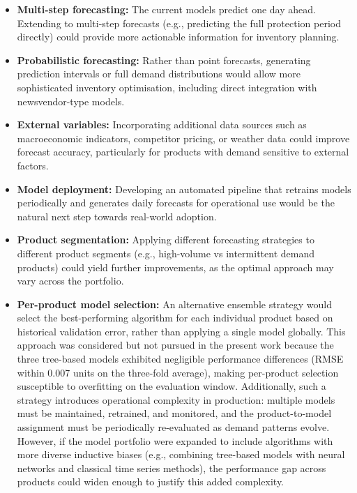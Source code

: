 \begin{itemize}
    \item \textbf{Multi-step forecasting:} The current models predict one day ahead. Extending to multi-step forecasts (e.g., predicting the full protection period directly) could provide more actionable information for inventory planning.

    \item \textbf{Probabilistic forecasting:} Rather than point forecasts, generating prediction intervals or full demand distributions would allow more sophisticated inventory optimisation, including direct integration with newsvendor-type models.

    \item \textbf{External variables:} Incorporating additional data sources such as macroeconomic indicators, competitor pricing, or weather data could improve forecast accuracy, particularly for products with demand sensitive to external factors.

    \item \textbf{Model deployment:} Developing an automated pipeline that retrains models periodically and generates daily forecasts for operational use would be the natural next step towards real-world adoption.

    \item \textbf{Product segmentation:} Applying different forecasting strategies to different product segments (e.g., high-volume vs intermittent demand products) could yield further improvements, as the optimal approach may vary across the portfolio.

    \item \textbf{Per-product model selection:} An alternative ensemble strategy would select the best-performing algorithm for each individual product based on historical validation error, rather than applying a single model globally. This approach was considered but not pursued in the present work because the three tree-based models exhibited negligible performance differences (RMSE within 0.007 units on the three-fold average), making per-product selection susceptible to overfitting on the evaluation window. Additionally, such a strategy introduces operational complexity in production: multiple models must be maintained, retrained, and monitored, and the product-to-model assignment must be periodically re-evaluated as demand patterns evolve. However, if the model portfolio were expanded to include algorithms with more diverse inductive biases (e.g., combining tree-based models with neural networks and classical time series methods), the performance gap across products could widen enough to justify this added complexity.
\end{itemize}
